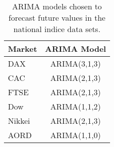 \begin{table}[ht]
\centering
\caption[ARIMA models chosen for the indice data sets]{ARIMA models chosen to forecast future values in the national indice data sets.} 
\label{tab:chp_ts_arima_models_chp6}
\begin{tabular}{lc}
  \toprule Market & ARIMA Model \\ 
  \midrule DAX & ARIMA(3,1,3)                    \\ 
  CAC & ARIMA(2,1,3)                    \\ 
  FTSE & ARIMA(2,1,3)                    \\ 
  Dow & ARIMA(1,1,2)                    \\ 
  Nikkei & ARIMA(2,1,3)                    \\ 
  AORD & ARIMA(1,1,0)                    \\ 
   \bottomrule \end{tabular}
\end{table}

